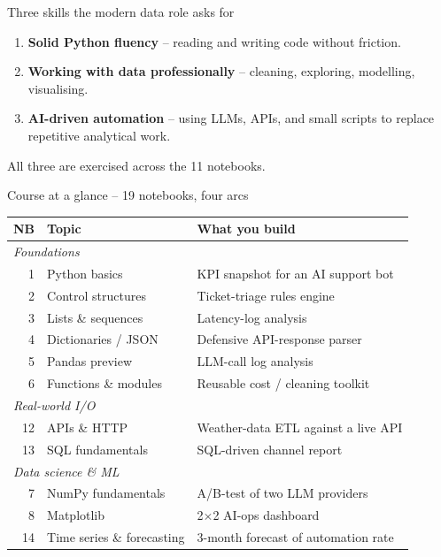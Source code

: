 \documentclass[aspectratio=169,11pt]{beamer}
\begin{document}
\begin{frame}{Three skills the modern data role asks for}
  \begin{enumerate}
    \item \textbf{Solid Python fluency} -- reading and writing code without friction.
    \item \textbf{Working with data professionally} -- cleaning, exploring, modelling, visualising.
    \item \textbf{AI-driven automation} -- using LLMs, APIs, and small scripts to replace repetitive analytical work.
  \end{enumerate}
  \vspace{8pt}
  All three are exercised across the 11 notebooks.
\end{frame}

\begin{frame}{Course at a glance -- 19 notebooks, four arcs}
  \footnotesize
  \begin{tabular}{rll}
    \toprule
    \textbf{NB} & \textbf{Topic} & \textbf{What you build} \\
    \midrule
    \multicolumn{3}{l}{\textit{Foundations}} \\
    1  & Python basics                  & KPI snapshot for an AI support bot \\
    2  & Control structures             & Ticket-triage rules engine \\
    3  & Lists \& sequences             & Latency-log analysis \\
    4  & Dictionaries / JSON            & Defensive API-response parser \\
    5  & Pandas preview                 & LLM-call log analysis \\
    6  & Functions \& modules           & Reusable cost / cleaning toolkit \\
    \multicolumn{3}{l}{\textit{Real-world I/O}} \\
    12 & APIs \& HTTP                   & Weather-data ETL against a live API \\
    13 & SQL fundamentals               & SQL-driven channel report \\
    \multicolumn{3}{l}{\textit{Data science \& ML}} \\
    7  & NumPy fundamentals             & A/B-test of two LLM providers \\
    8  & Matplotlib                     & 2$\times$2 AI-ops dashboard \\
    14 & Time series \& forecasting     & 3-month forecast of automation rate \\

\end{tabular}
\end{frame}
\end{document}
